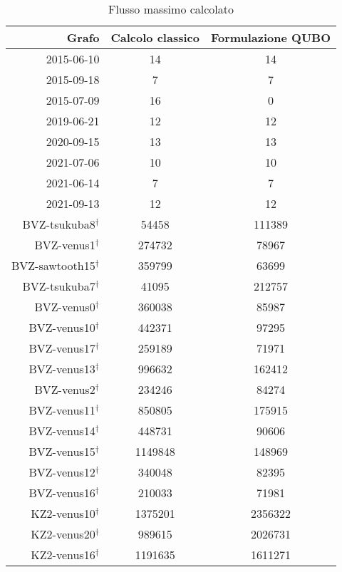 \documentclass{article}
\begin{document}
\begin{table}
    \caption{Flusso massimo calcolato}\label{tabella_valori}
    \centering
    \begin{tabular}{|r|c|c|}
    \hline
        Grafo & Calcolo classico & Formulazione QUBO \\ \hline
        2015-06-10 & 14 & 14 \\ \hline
        2015-09-18 & 7 & 7 \\ \hline
        2015-07-09 & 16 & 0 \\ \hline
        2019-06-21 & 12 & 12 \\ \hline
        2020-09-15 & 13 & 13 \\ \hline
        2021-07-06 & 10 & 10 \\ \hline
        2021-06-14 & 7 & 7 \\ \hline
        2021-09-13 & 12 & 12 \\ \hline\hline
        BVZ-tsukuba8$^\dagger$ & 54458 & 111389 \\ \hline
        BVZ-venus1$^\dagger$ & 274732 & 78967 \\ \hline
        BVZ-sawtooth15$^\dagger$ & 359799 & 63699 \\ \hline
        BVZ-tsukuba7$^\dagger$ & 41095 & 212757 \\ \hline
        BVZ-venus0$^\dagger$ & 360038 & 85987 \\ \hline
        BVZ-venus10$^\dagger$ & 442371 & 97295 \\ \hline
        BVZ-venus17$^\dagger$ & 259189 & 71971 \\ \hline
        BVZ-venus13$^\dagger$ & 996632 & 162412 \\ \hline
        BVZ-venus2$^\dagger$ & 234246 & 84274 \\ \hline
        BVZ-venus11$^\dagger$ & 850805 & 175915 \\ \hline
        BVZ-venus14$^\dagger$ & 448731 & 90606 \\ \hline
        BVZ-venus15$^\dagger$ & 1149848 & 148969 \\ \hline
        BVZ-venus12$^\dagger$ & 340048 & 82395 \\ \hline
        BVZ-venus16$^\dagger$ & 210033 & 71981 \\ \hline
        KZ2-venus10$^\dagger$ & 1375201 & 2356322 \\ \hline
        KZ2-venus20$^\dagger$ & 989615 & 2026731 \\ \hline
        KZ2-venus16$^\dagger$ & 1191635 & 1611271 \\ \hline

\end{tabular}
\end{table}
\end{document}
